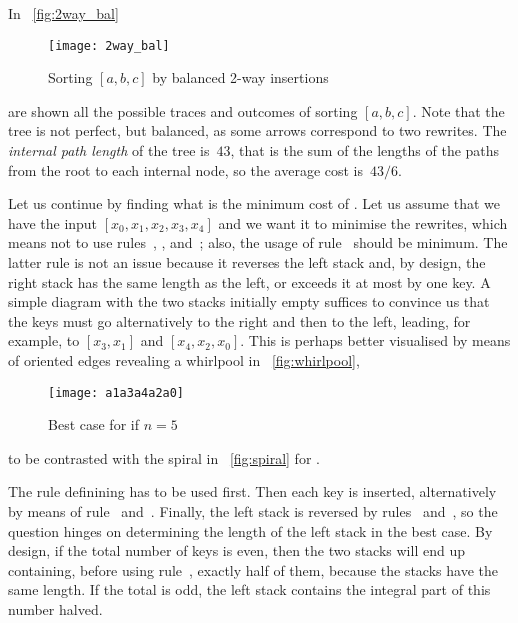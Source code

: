 In \fig~\vref{fig:2way_bal}
\begin{figure}
\centering
\texttt{[image: 2way\_bal]}
\caption{Sorting \([a,b,c]\) by balanced 2-way insertions}
\label{fig:2way_bal}
\end{figure}
are shown all the possible traces and
outcomes of sorting \([a,b,c]\). Note that the tree is not
perfect, but balanced, as some arrows
correspond to two rewrites. The \emph{internal path
  length}\label{insertion__internal_path_length}
 of the tree is~\(43\), that
is the sum of the lengths of the paths from the root to each internal
node, so the average cost is~\(43/6\).


Let us continue by finding what is the minimum cost of
. Let us assume that we have the input \([x_0, x_1, x_2,
x_3, x_4]\) and we want it to minimise the rewrites, which means not
to use rules~\clause{\sigma}, \clause{\tau}, \clause{\phi}
and~\clause{\chi}; also, the usage of rule~\clause{\rho} should be
minimum. The latter rule is not an issue because it reverses the left
stack and, by design, the right stack has the same length as the left,
or exceeds it at most by one key. A simple diagram with the two stacks
initially empty suffices to convince us that the keys must go
alternatively to the right and then to the left, leading, for example,
to \([x_3 , x_1]\) and \([x_4, x_2, x_0]\). This is perhaps better
visualised by means of oriented edges revealing a whirlpool in
\fig~\vref{fig:whirlpool},
\begin{figure}[b]
\centering
\texttt{[image: a1a3a4a2a0]}
\caption{Best case for  if \(n=5\)}
\label{fig:whirlpool}
\end{figure}
to be contrasted with the spiral in \fig~\vref{fig:spiral} for
.

The rule definining  has to be used first. Then each key is
inserted, alternatively by means of rule~\clause{\upsilon}
and~\clause{\psi}. Finally, the left stack is reversed by
rules~\clause{\pi} and~\clause{\rho}, so the question hinges on
determining the length of the left stack in the best case. By design,
if the total number of keys is even, then the two stacks will end up
containing, before using rule~\clause{\rho}, exactly half of them,
because the stacks have the same length. If the total is odd, the left
stack contains the integral part of this number halved.

